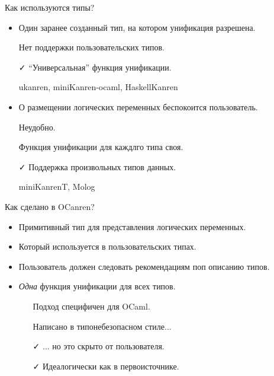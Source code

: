 \documentclass[10pt, mathserif]{beamer}
\theoremstyle{definition}
\begin{document}
\begin{frame}[fragile]{Как используются типы?}
\begin{itemize}
\item Один заранее созданный тип, на котором унификация разрешена.

    \faTimes \hspace{1em} Нет поддержки пользовательских типов.

    \faCheck \hspace{1em} ``Универсальная'' функция унификации.
    \vspace{1em}
    
    ukanren, miniKanren-ocaml, HaskellKanren
    
\pause
\item О размещении логических переменных беспокоится пользователь.

    \faTimes \hspace{1em} Неудобно.
    
    \faTimes \hspace{1em} Функция унификации для каждлго типа своя.
    
    \faCheck \hspace{1em} Поддержка произвольных типов данных.
    \vspace{1em}
    
    miniKanrenT, Molog
\end{itemize}
\end{frame}

\begin{frame}[fragile]{Как сделано в OCanren?}

\begin{itemize}
 \item Примитивный тип для представления логических переменных.
 \item Который используется в пользовательских типах.
 \item Пользователь должен следовать рекомендациям поп описанию типов.
 \pause
 \item \emph{Одна} функция унификации для всех типов.
    \vspace{1em}
    \begin{itemize}
    \item[\faTimes] Подход специфичен для OCaml.
    \item[\faTimes] Написано в типонебезопасном стиле...
    \item[\faCheck] ... но это скрыто от пользователя.
    \item[\faCheck] Идеалогически как в первоисточнике.
    \end{itemize}
  
\end{itemize}
\end{frame}
\end{document}
